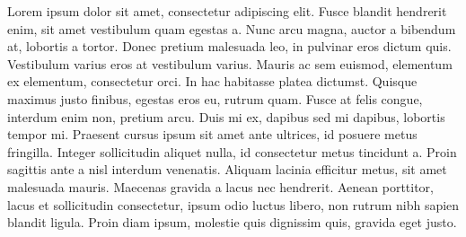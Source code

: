 
Lorem ipsum dolor sit amet, consectetur adipiscing elit. Fusce blandit hendrerit enim, sit amet vestibulum quam egestas a. Nunc arcu magna, auctor a bibendum at, lobortis a tortor. Donec pretium malesuada leo, in pulvinar eros dictum quis. Vestibulum varius eros at vestibulum varius. Mauris ac sem euismod, elementum ex elementum, consectetur orci. In hac habitasse platea dictumst. Quisque maximus justo finibus, egestas eros eu, rutrum quam. Fusce at felis congue, interdum enim non, pretium arcu. Duis mi ex, dapibus sed mi dapibus, lobortis tempor mi. Praesent cursus ipsum sit amet ante ultrices, id posuere metus fringilla. Integer sollicitudin aliquet nulla, id consectetur metus tincidunt a. Proin sagittis ante a nisl interdum venenatis. Aliquam lacinia efficitur metus, sit amet malesuada mauris. Maecenas gravida a lacus nec hendrerit. Aenean porttitor, lacus et sollicitudin consectetur, ipsum odio luctus libero, non rutrum nibh sapien blandit ligula. Proin diam ipsum, molestie quis dignissim quis, gravida eget justo.